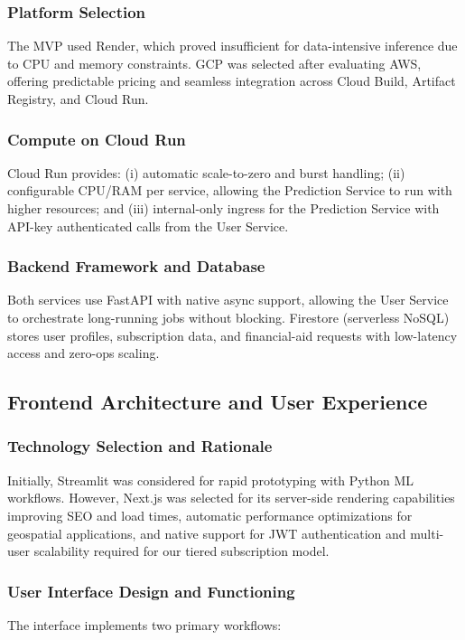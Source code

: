 \documentclass[conference]{IEEEtran}
\begin{document}
\subsubsection{Platform Selection}
The MVP used Render, which proved insufficient for data-intensive inference due to CPU and memory constraints. GCP was selected after evaluating AWS, offering predictable pricing and seamless integration across Cloud Build, Artifact Registry, and Cloud Run.

\subsubsection{Compute on Cloud Run}
Cloud Run provides: (i) automatic scale-to-zero and burst handling; (ii) configurable CPU/RAM per service, allowing the Prediction Service to run with higher resources; and (iii) internal-only ingress for the Prediction Service with API-key authenticated calls from the User Service.

\subsubsection{Backend Framework and Database}
Both services use FastAPI with native async support, allowing the User Service to orchestrate long-running jobs without blocking. Firestore (serverless NoSQL) stores user profiles, subscription data, and financial-aid requests with low-latency access and zero-ops scaling.

\subsection{Frontend Architecture and User Experience}

\subsubsection{Technology Selection and Rationale}
Initially, Streamlit was considered for rapid prototyping with Python ML workflows. However, Next.js was selected for its server-side rendering capabilities improving SEO and load times, automatic performance optimizations for geospatial applications, and native support for JWT authentication and multi-user scalability required for our tiered subscription model.

\subsubsection{User Interface Design and Functioning}
The interface implements two primary workflows:
\end{document}
